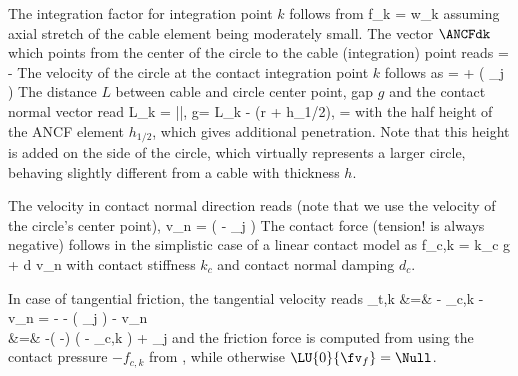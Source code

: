 \noindent The integration factor for integration point $k$ follows from
\be
  f_k =  w_k \eqComma
\ee
assuming axial stretch of the cable element being moderately small.
The vector $\ANCFdk$ which points from the center of the circle to the cable (integration) point reads
\be
  \ANCFdk =  -  
\ee
The velocity of the circle at the contact integration point $k$ follows as
\be
   =  + \left(  _{j} \right) \times \ANCFdk
\ee
The distance $L$ between cable and circle center point, gap $g$ and the contact normal vector read
\be
  L_k = |\ANCFdk|, \quad g= L_k - (r + h_{1/2}), \quad {} =  \ANCFdk
\ee
with the half height of the ANCF element $h_{1/2}$, which gives additional penetration. Note that this height is added on the side of the circle, which virtually represents a larger circle, behaving slightly different from a cable with thickness $h$.

\noindent The velocity in contact normal direction reads (note that we use the velocity of the circle's center point),
\be
  v_n =  \left(  - _j \right)
\ee
The contact force (tension! is always negative) follows in the simplistic case of a linear contact model as
\be \label{eq_GeneralContactASfc}
  f_{c,k} = k_c \cdot g  + d \cdot v_n
\ee
with contact stiffness $k_c$ and contact normal damping $d_c$.

\noindent In case of tangential friction, the tangential velocity reads
\bea
  \vv_{t,k} &=&  - _{c,k} - v_n \cdot {}
  =  -  - \left(  _{j} \right) \times \ANCFdk - v_n \cdot {} \nonumber \\
  &=& -\left( \otimes {} -\Im \right) \left(  - _{c,k} \right) 
      +  _{j} 
\eea
and the friction force is computed from  using the contact pressure $-f_{c,k}$ from , while otherwise $\LU{0}{\fv_f} = \Null$.

